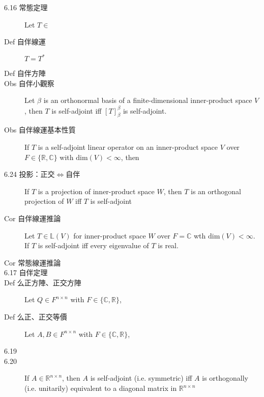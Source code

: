 \documentclass[9pt, twocolumn]{extarticle}
\newcommand{\vsdim}{\ensuremath{\text{dim}}}
\newcommand{\realnum}{\mathbb{R}}
\newcommand{\complexnum}{\mathbb{C}}
\newcommand{\ltrans}{\mathbb{L}}
\begin{document}
\begin{description}
    \item[6.16 常態定理] Let $T\in$ 
    \item[Def 自伴線運] $T = T^*$
    \item[Def 自伴方陣] 
    \item[Obs 自伴小觀察] Let $\beta$ is an orthonormal basis of a finite-dimensional inner-product space $V$, then $T$ is self-adjoint iff $[T]^\beta_\beta$ is self-adjoint.
    \item[Obs 自伴線運基本性質] If $T$ is a self-adjoint linear operator on an inner-product space $V$ over $F \in \{\realnum, \complexnum\}$ with $\vsdim(V)<\infty$, then
    \item[6.24 投影：正交$\Leftrightarrow$自伴] If $T$ is a projection of inner-product space $W$, then $T$ is an orthogonal projection of $W$ iff $T$ is self-adjoint
    \item[Cor 自伴線運推論] Let $T \in \ltrans(V)$ for inner-product space $W$ over $F = \complexnum$ wth $\vsdim(V) < \infty$. If $T$ is self-adjoint iff every eigenvalue of $T$ is real.
    \item[Cor 常態線運推論]


    \item[6.17 自伴定理]
    \item[Def 么正方陣、正交方陣] Let $Q \in F^{n\times n}$ with $F \in \{\complexnum, \realnum\}$,
    \item[Def 么正、正交等價] Let $A, B \in F^{n \times n}$ with $F \in \{\complexnum, \realnum\}$,
    \item[6.19]
    \item[6.20] If $A \in \realnum^{n\times n}$, then $A$ is self-adjoint (i.e. symmetric) iff $A$ is orthogonally (i.e. unitarily) equivalent to a diagonal matrix in $\realnum^{n\times n}$
   

\end{description}
\end{document}
